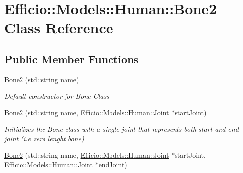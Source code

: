 \hypertarget{class_efficio_1_1_models_1_1_human_1_1_bone2}{}\section{Efficio\+:\+:Models\+:\+:Human\+:\+:Bone2 Class Reference}
\label{class_efficio_1_1_models_1_1_human_1_1_bone2}
\subsection*{Public Member Functions}
\begin{DoxyCompactItemize}
\item 
\hyperlink{class_efficio_1_1_models_1_1_human_1_1_bone2_a3958c7a1c4690b707819d58bd096bc42}{Bone2} (std\+::string name)\hypertarget{class_efficio_1_1_models_1_1_human_1_1_bone2_a3958c7a1c4690b707819d58bd096bc42}{}\label{class_efficio_1_1_models_1_1_human_1_1_bone2_a3958c7a1c4690b707819d58bd096bc42}

\begin{DoxyCompactList}\small\item\em Default constructor for Bone Class. \end{DoxyCompactList}\item 
\hyperlink{class_efficio_1_1_models_1_1_human_1_1_bone2_a90d21d7d741d0b5046de9f08dd053f75}{Bone2} (std\+::string name, \hyperlink{class_efficio_1_1_models_1_1_human_1_1_joint}{Efficio\+::\+Models\+::\+Human\+::\+Joint} $\ast$start\+Joint)\hypertarget{class_efficio_1_1_models_1_1_human_1_1_bone2_a90d21d7d741d0b5046de9f08dd053f75}{}\label{class_efficio_1_1_models_1_1_human_1_1_bone2_a90d21d7d741d0b5046de9f08dd053f75}

\begin{DoxyCompactList}\small\item\em Initializes the Bone class with a single joint that represents both start and end joint (i.\+e zero lenght bone) \end{DoxyCompactList}\item 
\hyperlink{class_efficio_1_1_models_1_1_human_1_1_bone2_a0878a112ea7b9754c3d02636a6046ee5}{Bone2} (std\+::string name, \hyperlink{class_efficio_1_1_models_1_1_human_1_1_joint}{Efficio\+::\+Models\+::\+Human\+::\+Joint} $\ast$start\+Joint, \hyperlink{class_efficio_1_1_models_1_1_human_1_1_joint}{Efficio\+::\+Models\+::\+Human\+::\+Joint} $\ast$end\+Joint)\hypertarget{class_efficio_1_1_models_1_1_human_1_1_bone2_a0878a112ea7b9754c3d02636a6046ee5}{}\label{class_efficio_1_1_models_1_1_human_1_1_bone2_a0878a112ea7b9754c3d02636a6046ee5}


\end{DoxyCompactItemize}
